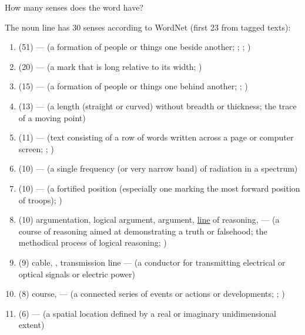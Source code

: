 \documentclass[a4paper,landscape,headrule,footrule]{foils}
\begin{document}

How many senses does the word  have?


The noun line has 30 senses according to WordNet (first 23 from tagged texts):

\begin{enumerate}
\item (51)  --- (a formation of people or things one beside another; ; ; )
\item (20)  --- (a mark that is long relative to its width; )
\item (15)  --- (a formation of people or things one behind another; ; )
\item (13)  --- (a length (straight or curved) without breadth or thickness; the trace of a moving point)
\item (11)  --- (text consisting of a row of words written across a page or computer screen; ; )
\item (10)  --- (a single frequency (or very narrow band) of radiation in a spectrum)
\item (10)  --- (a fortified position (especially one marking the most forward position of troops); )
\item (10) argumentation, logical argument, argument, \ul{line} of reasoning,  --- (a course of reasoning aimed at demonstrating a truth or falsehood; the methodical process of logical reasoning; )
\item (9) cable, , transmission line --- (a conductor for transmitting electrical or optical signals or electric power)
\item (8) course,  --- (a connected series of events or actions or developments; ; )
\item (6)  --- (a spatial location defined by a real or imaginary unidimensional extent)

\end{enumerate}
\end{document}
